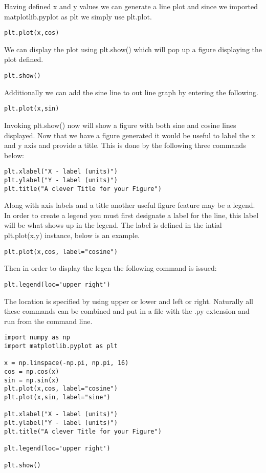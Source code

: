 Having defined x and y values we can generate a line plot and since we
imported matplotlib.pyplot as plt we simply use plt.plot.

\begin{lstlisting}
plt.plot(x,cos)
\end{lstlisting}
We can display the plot using plt.show() which will pop up a figure
displaying the plot defined. 

\begin{lstlisting}
plt.show()
\end{lstlisting}

Additionally we can add the sine line to out line graph by entering
the following. 

\begin{lstlisting}
plt.plot(x,sin)
\end{lstlisting}

Invoking plt.show() now will show a figure with both sine and
cosine lines displayed. Now that we have a figure generated it would
be useful to label the x and y axis and provide a title. This is done
by the following three commands below: 

\begin{lstlisting}
plt.xlabel("X - label (units)")
plt.ylabel("Y - label (units)")
plt.title("A clever Title for your Figure")
\end{lstlisting}

Along with axis labels and a title another useful figure feature may
be a legend. In order to create a legend you must first designate a
label for the line, this label will be what shows up in the
legend. The label is defined in the intial plt.plot(x,y) instance,
below is an example. 

\begin{lstlisting}
plt.plot(x,cos, label="cosine")
\end{lstlisting}

Then in order to display the legen the following command is issued:

\begin{lstlisting}
plt.legend(loc='upper right')
\end{lstlisting}

The location is specified by using upper or lower and left or
right. Naturally all these commands can be combined and put in a file
with the .py extension and run from the command line. 

\begin{lstlisting}
import numpy as np
import matplotlib.pyplot as plt

x = np.linspace(-np.pi, np.pi, 16)
cos = np.cos(x)
sin = np.sin(x)
plt.plot(x,cos, label="cosine")
plt.plot(x,sin, label="sine")

plt.xlabel("X - label (units)")
plt.ylabel("Y - label (units)")
plt.title("A clever Title for your Figure")

plt.legend(loc='upper right')

plt.show()

\end{lstlisting}

